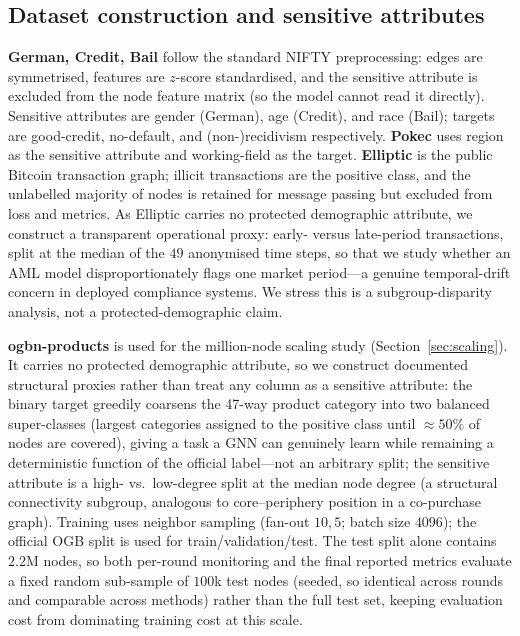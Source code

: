 \documentclass[pdflatex,sn-mathphys-num]{sn-jnl}
\theoremstyle{thmstyleone}%
\theoremstyle{thmstyletwo}%
\theoremstyle{thmstylethree}%
\begin{document}
\begin{appendices}
\section{Dataset construction and sensitive attributes}
\label{app:data}
\textbf{German, Credit, Bail} follow the standard NIFTY preprocessing: edges are
symmetrised, features are $z$-score standardised, and the sensitive attribute is
excluded from the node feature matrix (so the model cannot read it directly).
Sensitive attributes are gender (German), age (Credit), and race (Bail); targets
are good-credit, no-default, and (non-)recidivism respectively. \textbf{Pokec}
uses region as the sensitive attribute and working-field as the target.
\textbf{Elliptic} is the public Bitcoin transaction graph; illicit transactions
are the positive class, and the unlabelled majority of nodes is retained for
message passing but excluded from loss and metrics. As Elliptic carries no
protected demographic attribute, we construct a transparent operational proxy:
early- versus late-period transactions, split at the median of the $49$
anonymised time steps, so that we study whether an AML model disproportionately
flags one market period---a genuine temporal-drift concern in deployed
compliance systems. We stress this is a subgroup-disparity analysis, not a
protected-demographic claim.

\textbf{ogbn-products} is used for the million-node scaling study
(Section~\ref{sec:scaling}). It carries no protected demographic attribute, so
we construct documented structural proxies rather than treat any column as a
sensitive attribute: the binary target greedily coarsens the 47-way product
category into two balanced super-classes (largest categories assigned to the
positive class until $\approx\!50\%$ of nodes are covered), giving a task a
GNN can genuinely learn while remaining a deterministic function of the
official label---not an arbitrary split; the sensitive attribute is a
high- vs.\ low-degree split at the median node degree (a structural
connectivity subgroup, analogous to core–periphery position in a co-purchase
graph). Training uses neighbor sampling (fan-out $10,5$; batch size $4096$);
the official OGB split is used for train/validation/test. The test split
alone contains $2.2$M nodes, so both per-round monitoring and the final
reported metrics evaluate a fixed random sub-sample of $100$k test nodes
(seeded, so identical across rounds and comparable across methods) rather
than the full test set, keeping evaluation cost from dominating training
cost at this scale.


\end{appendices}
\end{document}
